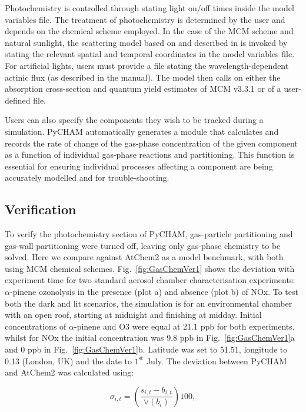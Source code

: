 \documentclass[gmd, manuscript]{copernicus}
\begin{document}
Photochemistry is controlled through stating light on/off times inside the model variables file.  The treatment of photochemistry is determined by the user and depends on the chemical scheme employed.  In the case of the MCM scheme and natural sunlight, the scattering model based on \citet{Hayman1997} and described in \citet{Saunders2003} is invoked by stating the relevant spatial and temporal coordinates in the model variables file.  For artificial lights, users must provide a file stating the wavelength-dependent actinic flux (as described in the manual).  The model then calls on either the absorption cross-section and quantum yield estimates of MCM v3.3.1 or of a user-defined file.

Users can also specify the components they wish to be tracked during a simulation.  PyCHAM automatically generates a module that calculates and records the rate of change of the gas-phase concentration of the given component as a function of individual gas-phase reactions and partitioning.  This function is essential for ensuring individual processes affecting a component are being accurately modelled and for trouble-shooting.


\subsection{Verification}
To verify the photochemistry section of PyCHAM, gas-particle partitioning and gas-wall partitioning were turned off, leaving only gas-phase chemistry to be solved.  Here we compare against AtChem2 \citep{sommariva_acm2018} as a model benchmark, with both using MCM chemical schemes.  Fig.~\ref{fig:GasChemVer1} shows the deviation with experiment time for two standard aerosol chamber characterisation experiments: $\alpha$-pinene ozonolysis in the presence (plot a) and absence (plot b) of NOx.  To test both the dark and lit scenarios, the simulation is for an environmental chamber with an open roof, starting at midnight and finishing at midday.  Initial concentrations of $\alpha$-pinene and O3 were equal at 21.1 ppb for both experiments, whilst for NOx the initial concentration was 9.8 ppb in Fig.~\ref{fig:GasChemVer1}a and 0 ppb in Fig.~\ref{fig:GasChemVer1}b.  Latitude was set to 51.51, longitude to 0.13 (London, UK) and the date to $\mathrm{1^{st}}$ July.  The deviation between PyCHAM and AtChem2 was calculated using:

\begin{equation} \label{eq:frac_dev}
\sigma_{i,t} = \left(\frac{s_{i,t}-b_{i,t}}{\lor(b_{i})}\right)100\mathrm{,}
\end{equation}
\end{document}
